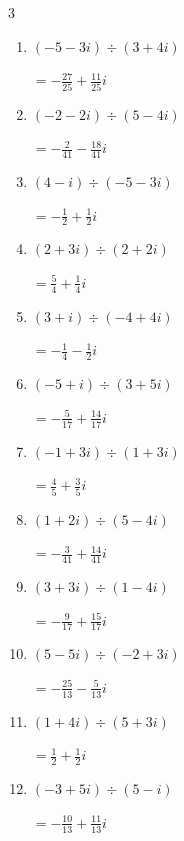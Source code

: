 \begin{multicols}{3}
\begin{enumerate}
  \item $\displaystyle (-5-3i)\div(3+4i)$

        $\displaystyle =-\frac{27}{25}+\frac{11}{25}i$

  \item $\displaystyle (-2-2i)\div(5-4i)$

        $\displaystyle =-\frac{2}{41}-\frac{18}{41}i$

  \item $\displaystyle (4-i)\div(-5-3i)$

        $\displaystyle =-\frac{1}{2}+\frac{1}{2}i$

  \item $\displaystyle (2+3i)\div(2+2i)$

        $\displaystyle =\frac{5}{4}+\frac{1}{4}i$

  \item $\displaystyle (3+i)\div(-4+4i)$

        $\displaystyle =-\frac{1}{4}-\frac{1}{2}i$

  \item $\displaystyle (-5+i)\div(3+5i)$

        $\displaystyle =-\frac{5}{17}+\frac{14}{17}i$

  \item $\displaystyle (-1+3i)\div(1+3i)$

        $\displaystyle =\frac{4}{5}+\frac{3}{5}i$

  \item $\displaystyle (1+2i)\div(5-4i)$

        $\displaystyle =-\frac{3}{41}+\frac{14}{41}i$

  \item $\displaystyle (3+3i)\div(1-4i)$

        $\displaystyle =-\frac{9}{17}+\frac{15}{17}i$

\columnbreak %

  \item $\displaystyle (5-5i)\div(-2+3i)$

        $\displaystyle =-\frac{25}{13}-\frac{5}{13}i$

  \item $\displaystyle (1+4i)\div(5+3i)$

        $\displaystyle =\frac{1}{2}+\frac{1}{2}i$

  \item $\displaystyle (-3+5i)\div(5-i)$

        $\displaystyle =-\frac{10}{13}+\frac{11}{13}i$


\end{enumerate}
\end{multicols}
